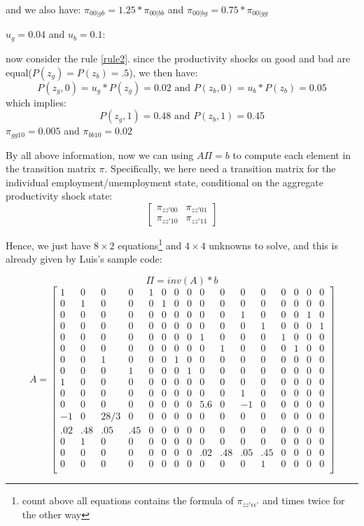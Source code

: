 and we also have: $\pi_{00|gb}=1.25*\pi_{00|bb}$ and $\pi_{00|bg} = 0.75 * \pi_{00|gg}$

{\color{red}{III.}} $u_g = 0.04$ and $u_b = 0.1$:

now consider the rule \ref{rule2}. since the productivity shocks on good and bad are equal($P(z_g)=P(z_b)=.5$), we then have:
\[ P(z_g, 0) = u_g * P(z_g) = 0.02 \text{ and } P(z_b, 0) = u_b * P(z_b) = 0.05\]
which implies:
\[ P(z_g, 1) = 0.48 \text{ and } P(z_b, 1) = 0.45\]
{\color{red}{IV.}} $\pi_{gg10} = 0.005$ and $\pi_{bb10} = 0.02$

By all above information, now we can using $A \Pi=b$ to compute each element in the transition matrix $\pi$. Specifically, we here need a transition matrix for the individual employment/unemployment state, conditional on the aggregate productivity shock state: 
\[   
\begin{bmatrix}
\pi_{zz'00} & \pi_{zz'01} \\ \pi_{zz'10} & \pi_{zz'11} 
\end{bmatrix}
\] 

Hence, we just have $8\times2$ equations\footnote{count above all equations contains the formula of $\pi_{zz'\epsilon\epsilon'}$ and times twice for the other way}  and $4 \times 4$ unknowns to solve, and this is already given by Luis's sample code:

\[ \Pi = inv(A)*b\]
\[   
A = 
\begin{bmatrix}
1 & 0 & 0  & 0 & 1  & 0 & 0 &  0 &  0 &  0 &  0 &  0 & 0 & 0 & 0 & 0\\
0 & 1 & 0  & 0 & 0  & 1 & 0 &  0 &  0 &  0 &  0 & 0  & 0 & 0 & 0 & 0\\
0 &  0 &  0&  0 &  0 &  0 &  0 &  0 &  0 &  0 &  1 &  0 &  0 &  0 &  1 &  0 \\
0 &  0&   0 & 0 & 0 & 0& 0 & 0& 0 &  0 &  0 &  1 &  0 &  0 &  0 &  1 \\
0& 0& 0 & 0&   0&   0& 0  & 0 &1&  0&  0 & 0 & 1 & 0  &0 & 0 \\
0 & 0 & 0 & 0 & 0 & 0 & 0 & 0 & 0 & 1 & 0 & 0 & 0  &1  &0 & 0 \\
0 & 0 & 1  &0 & 0 & 0 & 1 & 0  &0 & 0 & 0 & 0 & 0 & 0 & 0&  0 \\
0 & 0 & 0 & 1 & 0 & 0&  0&  1&  0 & 0 & 0 & 0 & 0 & 0 & 0 & 0 \\
1  &0  &0  &0  &0  &0  &0 & 0 & 0 & 0 & 0  &0  &0  &0  &0  &0 \\
0  &0  &0  &0  &0  &0  &0 & 0 & 0 & 0 & 1  &0  &0  &0  &0  &0 \\
0  &0 & 0  &0  &0  &0  &0 & 0 &5.6 &0 &-1  &0  &0  &0  &0  &0 \\
-1 &0 &28/3 &0  &0  &0  &0 & 0 & 0  &0  &0  &0  &0  &0  &0 & 0 \\
.02 &.48 &.05 &.45 &0 &0  &0 & 0 & 0  &0  &0  &0  &0  &0  &0  &0 \\
0 & 1  &0  &0  &0  &0  &0 & 0 & 0  &0  &0  &0  &0  &0  &0  &0 \\
0 & 0  &0  &0  &0  &0  &0 &0 &.02 &.48 &.05 &.45 &0 &0 &0  &0 \\
0 & 0  &0  &0 & 0  &0  &0 & 0 & 0 & 0  &0  &1  &0  &0  &0  &0\\

\end{bmatrix}
\] 


